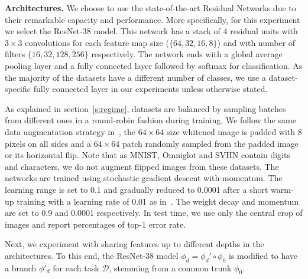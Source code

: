 \documentclass[10pt,twocolumn,letterpaper]{article}
\renewcommand{\paragraph}[1]{\par\medskip\noindent\textbf{#1}}
\begin{document}
\paragraph{Architectures.} We choose to use the state-of-the-art Residual Networks \cite{he2016identity} due to their remarkable capacity and performance. More specifically, for this experiment we select the ResNet-38 model. This network has a stack of 4 residual units with $3\times3$ convolutions for each feature map size ($\{64,32,16,8\}$) and with number of filters $\{16, 32, 128, 256\}$ respectively. The network ends with a global average pooling layer and a fully connected layer followed by softmax for classification. As the majority of the datasets have a different number of classes, we use a dataset-specific fully connected layer in our experiments unless otherwise stated.

As explained in section~\ref{s:regime}, datasets are balanced by sampling batches from different ones in a round-robin fashion during training. We follow the same data augmentation strategy in~\cite{he2016identity}, the $64\times64$ size whitened image is padded with 8 pixels on all sides and a $64\times64$ patch randomly sampled from the padded image or its horizontal flip. Note that as MNIST, Omniglot and SVHN contain digits and characters, we do not augment flipped images from these datasets. The networks are trained using stochastic gradient descent with momentum. The learning range is set to 0.1 and gradually reduced to 0.0001 after a short warm-up training with a learning rate of 0.01 as in~\cite{he2016identity}. The weight decay and momentum are set to 0.9 and 0.0001 respectively. In test time, we use only the central crop of images and report percentages of top-1 error rate.

Next, we experiment with sharing features up to different depths in the architectures. To this end, the ResNet-38 model $\phi_d = \phi_d' \circ \phi_0$ is modified to have a branch $\phi'_d$ for each task $\mathcal{D}$, stemming from a common trunk $\phi_0$.
\end{document}
